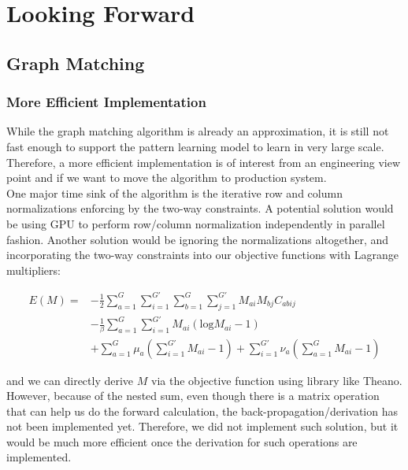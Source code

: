 \chapter{Looking Forward}

\section{Graph Matching}

\subsection{More Efficient Implementation}

While the graph matching algorithm is already an approximation, it is still not fast enough to support the pattern learning model to learn in very large scale. Therefore, a more efficient implementation is of interest from an engineering view point and if we want to move the algorithm to production system.\\

One major time sink of the algorithm is the iterative row and column normalizations enforcing by the two-way constraints. A potential solution would be using GPU to perform row/column normalization independently in parallel fashion. Another solution would be ignoring the normalizations altogether, and incorporating the two-way constraints into our objective functions with Lagrange multipliers:

\begin{align}
E(M)=&-\frac{1}{2}\sum_{a=1}^{G}\sum_{i=1}^{G'}\sum_{b=1}^{G}\sum_{j=1}^{G'}M_{ai}M_{bj}C_{abij}\nonumber\\
&-\frac{1}{\beta}\sum_{a=1}^{G}\sum_{i=1}^{G'}M_{ai}(\text{log}M_{ai}-1)\nonumber\\
&+\sum_{a=1}^{G}\mu_a(\sum_{i=1}^{G'}M_{ai}-1)+\sum_{i=1}^{G'}\nu_a(\sum_{a=1}^{G}M_{ai}-1)
\end{align}

and we can directly derive $M$ via the objective function using library like Theano\footnotemark. However, because of the nested sum, even though there is a matrix operation that can help us do the forward calculation, the back-propagation/derivation has not been implemented yet. Therefore, we did not implement such solution, but it would be much more efficient once the derivation for such operations are implemented.\\

